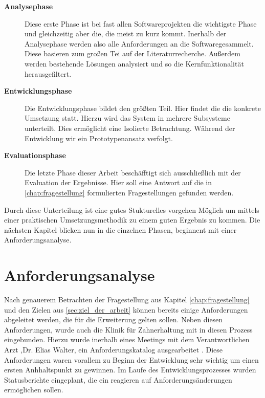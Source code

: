 \begin{description}
	\item[\textbf{Analysephase}] Diese erste Phase ist bei fast allen Softwareprojekten
		die wichtigste Phase und gleichzeitig aber die, die meist zu kurz kommt. Inerhalb
		der Analysephase werden also alle Anforderungen an die Softwaregesammelt.
		Diese basieren zum großen Tei auf der Literaturrecherche. Außerdem werden bestehende
		Lösungen analysiert und so die Kernfunktionalität herausgefiltert.

	\item[\textbf{Entwicklungsphase}] Die Entwicklungsphase bildet den größten Teil.
		Hier findet die die konkrete Umsetzung statt. Hierzu wird das System in mehrere
		Subsysteme unterteilt. Dies ermöglicht eine Isolierte Betrachtung. Während der
		Entwicklung wir ein Prototypenansatz verfolgt.

	\item[\textbf{Evaluationsphase}] Die letzte Phase dieser Arbeit beschäfftigt sich
		ausschließlich mit der Evaluation der Ergebnisse. Hier soll eine Antwort auf
		die in \ref{chap:fragestellung} formulierten Fragestellungen gefunden werden.
\end{description}

Durch diese Unterteilung ist eine gutes Stukturelles vorgehen Möglich um mittels
einer praktischen Umsetzungsmethodik zu einem guten Ergebnis zu kommen. Die
nächsten Kapitel blicken nun in die einzelnen Phasen, beginnent mit einer Anforderungsanalyse.

\section{Anforderungsanalyse}
\label{sec:anforderungsanalyse} Nach genauerem Betrachten der Fragestellung aus Kapitel
\ref{chap:fragestellung} und den Zielen aus \ref{sec:ziel_der_arbeit} können bereits
einige Anforderungen abgeleitet werden, die für die Erweiterung gelten sollen. Neben
diesen Anforderungen, wurde auch die Klinik für Zahnerhaltung mit in diesen
Prozess eingebunden. Hierzu wurde inerhalb eines Meetings mit dem Verantwortlichen
Arzt ,Dr. Elias Walter, ein Anforderungskatalog ausgearbeitet \citep[vgl.][]{walter2025}.
Diese Anforderungen waren vorallem zu Beginn der Entwicklung sehr wichtig um
einen ersten Anhhaltspunkt zu gewinnen. Im Laufe des Entwicklungsprozesses wurden
Statusberichte eingeplant, die ein reagieren auf Anforderungsänderungen
ermöglichen sollen.

